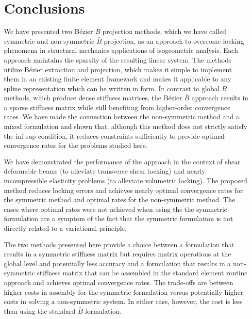 \section{Conclusions}
\label{sec:conclusion}

We have presented two B\'{e}zier $\bar{B}$ projection methods, which we have called symmetric and non-symmetric \Bezier $\bar{B}$ projection, as an approach to overcome locking phenomena in structural mechanics applications of isogeometric analysis. Each approach maintains the sparsity of the resulting linear system. The methods utilize B\'ezier extraction and projection, which makes it simple to implement them in an existing finite element framework and makes it applicable to any spline representation which can be written in \Bezier form. In contrast to global $\bar{B}$ methods, which produce dense stiffness matrices, the B\'ezier $\bar{B}$ approach results in a sparse stiffness matrix while still benefiting from higher-order convergence rates. {We have made the connection between the non-symmetric method and a mixed formulation and shown that, although this method does not strictly satisfy the inf-sup condition, it reduces constraints sufficiently to provide optimal convergence rates for the problems studied here.}

We have demonstrated the performance of the approach in the context of shear deformable beams (to alleviate transverse shear locking) and nearly incompressible elasticity problems (to alleviate volumetric locking). The proposed method reduces locking errors and achieves nearly optimal convergence rates { for the symmetric method and optimal rates for the non-symmetric method}. The cases where optimal rates were not achieved {when using the the symmetric formulation are a symptom of the fact that the symmetric formulation is not directly related to a variational principle}.

{The two methods presented here provide a choice between a formulation that results in a symmetric stiffness matrix but requires matrix operations at the global level and potentially less accuracy and a formulation that results in a non-symmetric stiffness matrix that can be assembled in the standard element routine approach and achieves optimal convergence rates. The trade-offs are between higher costs in assembly for the symmetric formulation versus potentially higher costs in solving a non-symmetric system. In either case, however, the cost is less than using the standard $\bar{B}$ formulation.}


\clearpage\null\newpage